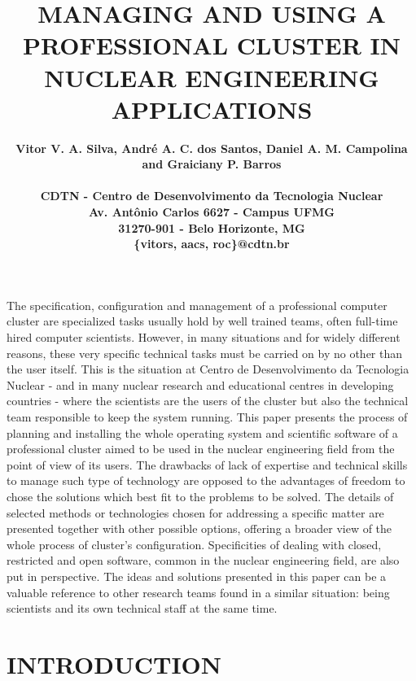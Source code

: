 \documentclass[twoside,a4paper,12pt,english]{inac17}
\title{MANAGING AND USING A PROFESSIONAL CLUSTER IN NUCLEAR ENGINEERING APPLICATIONS}
\author{
  \bf{Vitor V. A. Silva, Andr\'e A. C. dos Santos, Daniel A. M. Campolina and Graiciany P. Barros}\\ \\
  CDTN - Centro de Desenvolvimento da Tecnologia Nuclear\\
  Av. Ant\^onio Carlos 6627 - Campus UFMG\\
  31270-901 - Belo Horizonte, MG\\
  \{vitors, aacs, roc\}@cdtn.br}
\begin{document}
\maketitle

\tableofcontents
\tableofcontents


\pagestyle{myheadings}
\thispagestyle{empty}
\markboth{}{}


\thispagestyle{empty}

\begin{abstract_full_paper}
  The specification, configuration and management of a professional computer cluster are specialized
tasks usually hold by well trained teams, often full-time hired computer scientists. However, in
many situations and for widely different reasons, these very specific technical tasks must
be carried on by no other than the user itself. This is the situation at Centro de Desenvolvimento
da Tecnologia Nuclear - and in many nuclear research and educational centres in developing countries -
where the scientists are the users of the cluster but also the technical
team responsible to keep the system running. This paper presents the process of planning
and installing the whole operating system and scientific software of a professional cluster
aimed to be used in the nuclear engineering field from the point of view of its users.
The drawbacks of lack of expertise and technical skills to
manage such type of technology are opposed to the advantages of freedom to chose the solutions
which best fit to the problems to be solved. The details of selected methods or technologies
chosen for addressing a specific matter are presented together with other possible options, 
offering a broader view of the whole process of cluster's configuration. Specificities
of dealing with closed, restricted and open software, common in the nuclear engineering field,
are also put in perspective. The ideas and solutions presented in this paper can be a
valuable reference to other research teams found in a similar situation:
being scientists and its own technical staff at the same time.
\end{abstract_full_paper}

\section{INTRODUCTION}\label{int}
\end{document}
